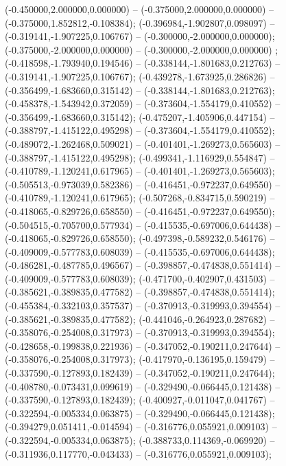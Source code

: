  (-0.450000,2.000000,0.000000) -- (-0.375000,2.000000,0.000000) -- (-0.375000,1.852812,-0.108384);
 (-0.396984,-1.902807,0.098097) -- (-0.319141,-1.907225,0.106767) -- (-0.300000,-2.000000,0.000000);
 (-0.375000,-2.000000,0.000000) -- (-0.300000,-2.000000,0.000000) ;
 (-0.418598,-1.793940,0.194546) -- (-0.338144,-1.801683,0.212763) -- (-0.319141,-1.907225,0.106767);
 (-0.439278,-1.673925,0.286826) -- (-0.356499,-1.683660,0.315142) -- (-0.338144,-1.801683,0.212763);
 (-0.458378,-1.543942,0.372059) -- (-0.373604,-1.554179,0.410552) -- (-0.356499,-1.683660,0.315142);
 (-0.475207,-1.405906,0.447154) -- (-0.388797,-1.415122,0.495298) -- (-0.373604,-1.554179,0.410552);
 (-0.489072,-1.262468,0.509021) -- (-0.401401,-1.269273,0.565603) -- (-0.388797,-1.415122,0.495298);
 (-0.499341,-1.116929,0.554847) -- (-0.410789,-1.120241,0.617965) -- (-0.401401,-1.269273,0.565603);
 (-0.505513,-0.973039,0.582386) -- (-0.416451,-0.972237,0.649550) -- (-0.410789,-1.120241,0.617965);
 (-0.507268,-0.834715,0.590219) -- (-0.418065,-0.829726,0.658550) -- (-0.416451,-0.972237,0.649550);
 (-0.504515,-0.705700,0.577934) -- (-0.415535,-0.697006,0.644438) -- (-0.418065,-0.829726,0.658550);
 (-0.497398,-0.589232,0.546176) -- (-0.409009,-0.577783,0.608039) -- (-0.415535,-0.697006,0.644438);
 (-0.486281,-0.487785,0.496567) -- (-0.398857,-0.474838,0.551414) -- (-0.409009,-0.577783,0.608039);
 (-0.471700,-0.402907,0.431503) -- (-0.385621,-0.389835,0.477582) -- (-0.398857,-0.474838,0.551414);
 (-0.455384,-0.332103,0.357537) -- (-0.370913,-0.319993,0.394554) -- (-0.385621,-0.389835,0.477582);
 (-0.441046,-0.264923,0.287682) -- (-0.358076,-0.254008,0.317973) -- (-0.370913,-0.319993,0.394554);
 (-0.428658,-0.199838,0.221936) -- (-0.347052,-0.190211,0.247644) -- (-0.358076,-0.254008,0.317973);
 (-0.417970,-0.136195,0.159479) -- (-0.337590,-0.127893,0.182439) -- (-0.347052,-0.190211,0.247644);
 (-0.408780,-0.073431,0.099619) -- (-0.329490,-0.066445,0.121438) -- (-0.337590,-0.127893,0.182439);
 (-0.400927,-0.011047,0.041767) -- (-0.322594,-0.005334,0.063875) -- (-0.329490,-0.066445,0.121438);
 (-0.394279,0.051411,-0.014594) -- (-0.316776,0.055921,0.009103) -- (-0.322594,-0.005334,0.063875);
 (-0.388733,0.114369,-0.069920) -- (-0.311936,0.117770,-0.043433) -- (-0.316776,0.055921,0.009103);
